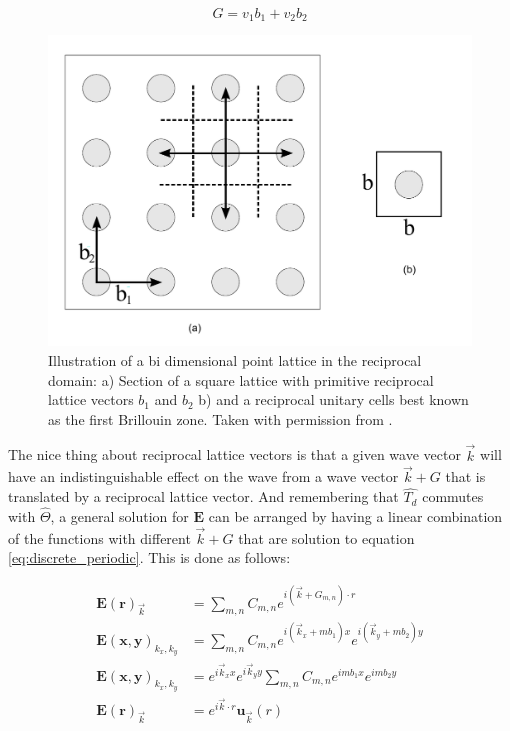\begin{equation}
G = v_1b_1+v_2b_2
\label{reciprocal_vectors}
\end{equation}


\begin{figure}
\centering
\includegraphics[scale=.5]{./img/squarer.pdf}
\caption{Illustration of a bi dimensional point lattice in the reciprocal domain: a) Section of a square lattice with primitive reciprocal lattice vectors $b_1$ and $b_2$ b)  and a reciprocal unitary cells best known as the first Brillouin zone. Taken with permission from \cite{Guarin2012}.}
\label{fig:rec_sq_lat_fig}
\end{figure}

The nice thing about reciprocal lattice vectors is that a given wave vector $\vec{k}$ will have an indistinguishable effect on the wave from a wave vector $\vec{k} + G$ that is translated by a reciprocal lattice vector.  And remembering that $\hat{T_d}$ commutes with $\hat{\Theta}$, a general solution for $\mathbf{E}$ can be arranged by having a linear combination of the functions with different $\vec{k} + G$ that are solution to equation \ref{eq:discrete_periodic}. This is done as follows:

\begin{align*}
\mathbf{E(r)}_{\vec{k}} &= \sum_{m,n}C_{m,n}e^{i(\vec{k}+G_{m,n})\cdot r}\\
\mathbf{E(x,y)}_{k_x,k_y} &= \sum_{m,n}C_{m,n}e^{i(\vec{k}_x + mb_1)x}e^{i(\vec{k}_y + mb_2)y}\\
\mathbf{E(x,y)}_{k_x,k_y} &= e^{i\vec{k}_x x}e^{i\vec{k}_y y}\sum_{m,n}C_{m,n}e^{imb_1x}e^{imb_2y}\\
\mathbf{E(r)}_{\vec{k}} &= e^{i\vec{k}\cdot r} \mathbf{u}_{\vec{k}}(r)
\end{align*}

